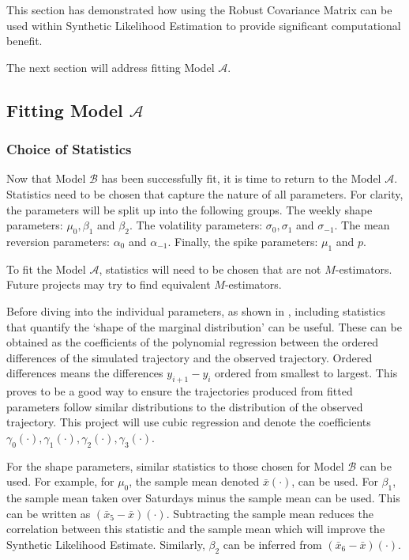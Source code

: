 This section has demonstrated how using the Robust Covariance Matrix can be used within Synthetic Likelihood Estimation to provide significant computational benefit.

The next section will address fitting Model $\mathcal{A}$.

\subsection{Fitting Model \texorpdfstring{$\mathcal{A}$}{A}}
\label{subsec:fit-full-model}

\subsubsection{Choice of Statistics}
\label{subsec:full-stats}

Now that Model $\mathcal{B}$ has been successfully fit, it is time to return to the Model $\mathcal{A}$. Statistics need to be chosen that capture the nature of all parameters. For clarity, the parameters will be split up into the following groups. The weekly shape parameters: $\mu_0, \beta_1$ and $\beta_2$. The volatility parameters: $\sigma_0, \sigma_1$ and $\sigma_{-1}$. The mean reversion parameters: $\alpha_0$ and $\alpha_{-1}$. Finally, the spike parameters: $\mu_1$ and $p$.

To fit the Model $\mathcal{A}$, statistics will need to be chosen that are not $M$-estimators. Future projects may try to find equivalent $M$-estimators.

Before diving into the individual parameters, as shown in \cite{wood_2010}, including statistics that quantify the `shape of the marginal distribution' can be useful. These can be obtained as the coefficients of the polynomial regression between the ordered differences of the simulated trajectory and the observed trajectory. Ordered differences means the differences $y_{i+1} - y_i$ ordered from smallest to largest. This proves to be a good way to ensure the trajectories produced from fitted parameters follow similar distributions to the distribution of the observed trajectory. This project will use cubic regression and denote the coefficients $\gamma_0(\cdot), \gamma_1(\cdot), \gamma_2(\cdot), \gamma_3(\cdot)$.

For the shape parameters, similar statistics to those chosen for Model $\mathcal{B}$ can be used. For example, for $\mu_0$, the sample mean denoted $\bar{x}(\cdot)$, can be used. For $\beta_1$, the sample mean taken over Saturdays minus the sample mean can be used. This can be written as $(\bar{x}_5 - \bar{x})(\cdot)$. Subtracting the sample mean reduces the correlation between this statistic and the sample mean which will improve the Synthetic Likelihood Estimate. Similarly, $\beta_2$ can be inferred from $(\bar{x}_6 - \bar{x})(\cdot)$.

